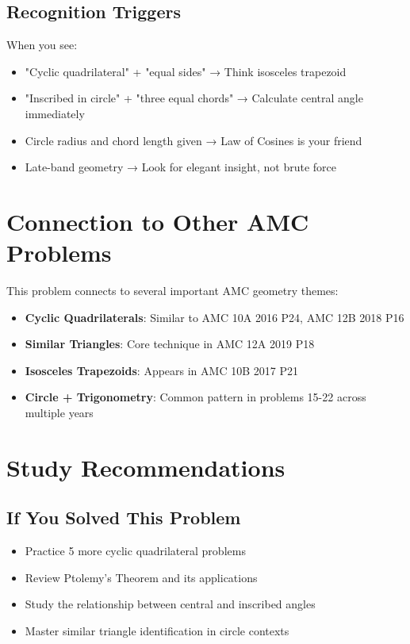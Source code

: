 \documentclass[12pt]{article}
\begin{document}
\subsection*{Recognition Triggers}
When you see:
\begin{itemize}[leftmargin=*]
    \item "Cyclic quadrilateral" + "equal sides" → Think isosceles trapezoid
    \item "Inscribed in circle" + "three equal chords" → Calculate central angle immediately
    \item Circle radius and chord length given → Law of Cosines is your friend
    \item Late-band geometry → Look for elegant insight, not brute force
\end{itemize}

\section*{Connection to Other AMC Problems}

This problem connects to several important AMC geometry themes:
\begin{itemize}[leftmargin=*]
    \item \textbf{Cyclic Quadrilaterals}: Similar to AMC 10A 2016 P24, AMC 12B 2018 P16
    \item \textbf{Similar Triangles}: Core technique in AMC 12A 2019 P18
    \item \textbf{Isosceles Trapezoids}: Appears in AMC 10B 2017 P21
    \item \textbf{Circle + Trigonometry}: Common pattern in problems 15-22 across multiple years
\end{itemize}

\section*{Study Recommendations}

\subsection*{If You Solved This Problem}
\begin{itemize}[leftmargin=*]
    \item Practice 5 more cyclic quadrilateral problems
    \item Review Ptolemy's Theorem and its applications
    \item Study the relationship between central and inscribed angles
    \item Master similar triangle identification in circle contexts
\end{itemize}
\end{document}
